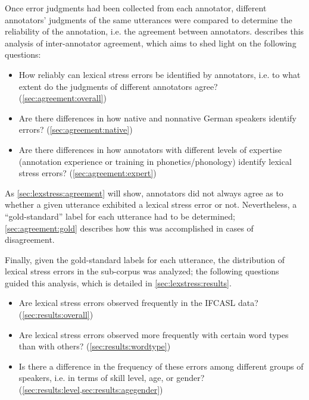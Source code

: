 	Once error judgments had been collected from each annotator, different annotators' judgments of the same utterances were compared to determine the reliability of the annotation, i.e. the agreement between annotators.
	 describes this analysis of inter-annotator agreement, which aims to shed light on the following questions:
	\begin{itemize}
	\item{How reliably can lexical stress errors be identified by
	annotators, i.e. to what extent do the judgments of different annotators agree?  (\cref{sec:agreement:overall})}
	\item{Are there differences in how native and nonnative German speakers identify errors?  (\cref{sec:agreement:native})}
	\item{Are there differences in how 
	annotators with different levels of expertise
	(annotation experience or training in phonetics/phonology) identify lexical stress errors?  (\cref{sec:agreement:expert})} 
	\end{itemize}
	As \cref{sec:lexstress:agreement} will show, annotators did not always agree as to whether a given utterance exhibited a lexical stress error or not. Nevertheless, a ``gold-standard'' label for each utterance had to be determined; \cref{sec:agreement:gold} describes how this was accomplished in cases of disagreement.
	
	Finally, given the gold-standard labels for each utterance, the distribution of lexical stress errors in the sub-corpus was analyzed; the following questions guided this analysis, which is detailed in \cref{sec:lexstress:results}.
	\begin{itemize}
	\item{Are lexical stress errors observed frequently in the IFCASL data? (\cref{sec:results:overall})}
		\item{Are lexical stress errors observed more frequently with certain word types than with others?  (\cref{sec:results:wordtype})}
	\item{Is there a difference in the frequency of these errors among different groups of speakers, i.e. in terms of skill level, age, or gender? (\cref{sec:results:level,sec:results:agegender})}
	\end{itemize}
	
